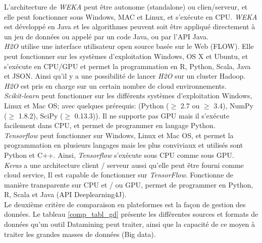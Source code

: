 L’architecture de \textit{WEKA} peut être autonome (standalone) ou clien/serveur, et elle peut fonctionner sous Windows, MAC et Linux, et s'exécute en CPU.
\textit{WEKA} est développé en Java et les algorithmes peuvent soit être appliqué directement à un jeu de données ou appelé par un code Java, ou par l'API Java.\\

\textit{H2O} utilise une interface utilisateur open source basée sur le Web (FLOW). Elle peut fonctionner sur les systèmes d’exploitation Windows, OS X et Ubuntu, et s'exécute en CPU/GPU et permet la programmation en R, Python, Scala, Java et JSON. Ainsi qu'il y a une possibilité de lancer \textit{H2O}
sur un cluster Hadoop. \textit{H2O} est pris en charge sur un certain nombre de cloud environnements.\\

\textit{Scikit-learn} peut fonctionner sur les différents systèmes d'exploitation Windows, Linux et Mac OS; avec quelques prérequis: (Python ($\geq$ 2.7 ou $\geq$ 3.4), NumPy ($\geq$ 1.8.2), SciPy ($\geq$ 0.13.3)). Il ne supporte pas GPU mais il s'exécute facilement dans CPU, et permet de programmer en langage Python.\\

\textit{Tensorflow} peut fonctionner sur Windows, Linux et Mac OS, et permet la programmation en plusieurs langages mais les plus conviviaux et utilisés sont Python et C++. Ainsi, \textit{Tensorflow} s'exécute sous CPU comme sous GPU.\\

\textit{Keras} a une architecture client / serveur aussi qu'elle peut être fourni comme cloud service, Il est capable de fonctionner sur \textit{TensorFlow}. Fonctionne de manière transparente sur CPU et / ou GPU, permet de programmer en Python, R, Scala et Java (API Deeplearning4J).\\


Le deuxième critère de comparaison en plateformes est la façon de gestion des données. Le tableau \ref{comp_tabl_gd} présente les différentes sources et formats de données qu'un outil Datamining peut traiter, ainsi que la capacité de ce moyen à traiter les grandes masses de données (Big data).\\

